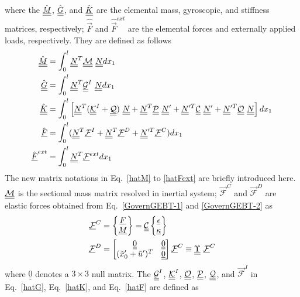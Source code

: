 where the $\hat{\underline{\underline{M}}}$, $\hat{\underline{\underline{G}}}$, and $\hat{\underline{\underline{K}}}$ are the
elemental mass, gyroscopic, and stiffness matrices, respectively;
$\hat{\vec{F}}$ and $\hat{\vec{F}}^{ext}$ are the elemental forces and
externally applied loads, respectively. They are defined as follows
\begin{align}
	\label{hatM} 
	\hat{\underline{\underline{M}}}&= \int_0^l \underline{\underline{N}}^T \mathcal{\underline{\underline{M}}} ~\underline{\underline{N}} dx_1 \\
	\label{hatG}
	\hat{\underline{\underline{G}}} &= \int_0^l \underline{\underline{N}}^T \underline{\underline{\mathcal{G}}}^I~\underline{\underline{N}} dx_1\\ 
	\label{hatK}
	\hat{\underline{\underline{K}}}&=\int_0^l \left[ \underline{\underline{N}}^T (\underline{\underline{\mathcal{K}}}^I + \mathcal{\underline{\underline{Q}}})~ \underline{\underline{N}} + \underline{\underline{N}}^T \mathcal{\underline{\underline{P}}}~ \underline{\underline{N}}^\prime + \underline{\underline{N}}^{\prime T} \mathcal{\underline{\underline{C}}}~ \underline{\underline{N}}^\prime + \underline{\underline{N}}^{\prime T} \mathcal{\underline{\underline{O}}}~ \underline{\underline{N}} \right] d x_1 \\	
	\label{hatF}
	\hat{\underline{F}} &= \int_0^l (\underline{\underline{N}}^T \underline{\mathcal{F}}^I + \underline{\underline{N}}^T \mathcal{\underline{F}}^D + \underline{\underline{N}}^{\prime T} \mathcal{\underline{F}}^C)dx_1 \\
	\label{hatFext}
	\hat{\underline{F}}^{ext}& = \int_0^l \underline{\underline{N}}^T \mathcal{\underline{F}}^{ext} dx_1 
\end{align}
The new matrix notations in Eq.~\eqref{hatM} to \eqref{hatFext} are briefly
introduced here. $\mathcal{\underline{\underline{M}}}$ is the sectional mass matrix resolved
in inertial system; $\mathcal{\vec{F}}^C$ and $\mathcal{\vec{F}}^D$ are
elastic forces obtained from Eq.~\eqref{GovernGEBT-1} and
\eqref{GovernGEBT-2} as
\begin{align}
	\label{FC}
	\mathcal{\underline{F}}^C &= \begin{Bmatrix}
         \underline{F} \\
	\underline{M}
	\end{Bmatrix} = \underline{\underline{\mathcal{C}}} \begin{Bmatrix}
	\underline{\epsilon} \\
	\underline{\kappa}
	\end{Bmatrix} \\
	\label{FD}
	\mathcal{\underline{F}}^D & = \begin{bmatrix}
	\underline{\underline{0}} & \underline{\underline{0}}\\
	(\tilde{x}_0^\prime+\tilde{u}^\prime)^T & \underline{\underline{0}}
	\end{bmatrix}
	\mathcal{\underline{F}}^C \equiv \underline{\underline{\Upsilon}}~ \mathcal{\underline{F}}^C
\end{align}
where $\underline{\underline{0}}$ denotes a $3 \times 3$ null matrix. The $\underline{\underline{\mathcal{G}}}^I$, $\underline{\underline{\mathcal{K}}}^I$,  $\mathcal{\underline{\underline{O}}}$, $\mathcal{\underline{\underline{P}}}$, $\mathcal{\underline{\underline{Q}}}$, and $\vec{\mathcal{F}}^I$ in Eq.~\eqref{hatG}, Eq.~\eqref{hatK}, and Eq.~\eqref{hatF} are defined as
